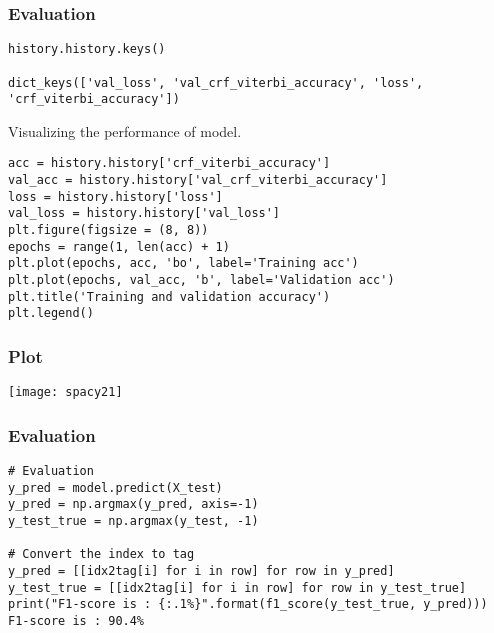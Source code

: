 \begin{frame}[fragile]\frametitle{Evaluation}

\begin{lstlisting}
history.history.keys()

dict_keys(['val_loss', 'val_crf_viterbi_accuracy', 'loss', 'crf_viterbi_accuracy'])
\end{lstlisting}

Visualizing the performance of model.
\begin{lstlisting}
acc = history.history['crf_viterbi_accuracy']
val_acc = history.history['val_crf_viterbi_accuracy']
loss = history.history['loss']
val_loss = history.history['val_loss']
plt.figure(figsize = (8, 8))
epochs = range(1, len(acc) + 1)
plt.plot(epochs, acc, 'bo', label='Training acc')
plt.plot(epochs, val_acc, 'b', label='Validation acc')
plt.title('Training and validation accuracy')
plt.legend()
\end{lstlisting}


\end{frame}

\begin{frame}[fragile]\frametitle{Plot}
	
\begin{center}
\texttt{[image: spacy21]}
\end{center}


\end{frame}

\begin{frame}[fragile]\frametitle{Evaluation}

\begin{lstlisting}
# Evaluation
y_pred = model.predict(X_test)
y_pred = np.argmax(y_pred, axis=-1)
y_test_true = np.argmax(y_test, -1)

# Convert the index to tag
y_pred = [[idx2tag[i] for i in row] for row in y_pred]
y_test_true = [[idx2tag[i] for i in row] for row in y_test_true]
print("F1-score is : {:.1%}".format(f1_score(y_test_true, y_pred)))
F1-score is : 90.4%

\end{lstlisting}


\end{frame}

